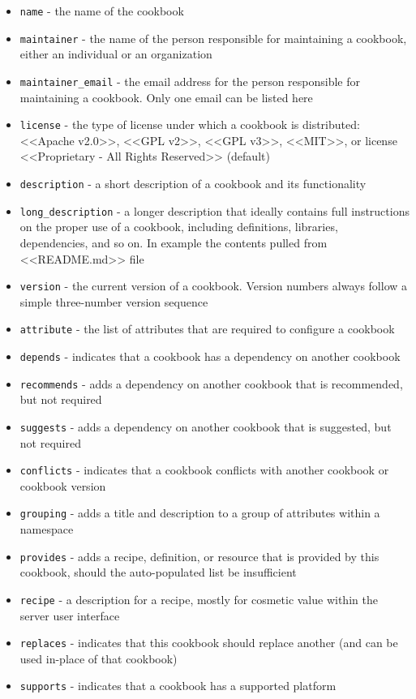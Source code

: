 \begin{itemize}
  \item \lstinline!name! - the name of the cookbook
  \item \lstinline!maintainer! - the name of the person responsible for maintaining a cookbook, either an individual or an organization
  \item \lstinline!maintainer_email! - the email address for the person responsible for maintaining a cookbook. Only one email can be listed here
  \item \lstinline!license! - the type of license under which a cookbook is distributed: <<Apache v2.0>>, <<GPL v2>>, <<GPL v3>>, <<MIT>>, or license <<Proprietary - All Rights Reserved>> (default)
  \item \lstinline!description! - a short description of a cookbook and its functionality
  \item \lstinline!long_description! - a longer description that ideally contains full instructions on the proper use of a cookbook, including definitions, libraries, dependencies, and so on. In example the contents pulled from <<README.md>> file
  \item \lstinline!version! - the current version of a cookbook. Version numbers always follow a simple three-number version sequence
  \item \lstinline!attribute! - the list of attributes that are required to configure a cookbook
  \item \lstinline!depends! - indicates that a cookbook has a dependency on another cookbook
  \item \lstinline!recommends! - adds a dependency on another cookbook that is recommended, but not required
  \item \lstinline!suggests! - adds a dependency on another cookbook that is suggested, but not required
  \item \lstinline!conflicts! - indicates that a cookbook conflicts with another cookbook or cookbook version
  \item \lstinline!grouping! - adds a title and description to a group of attributes within a namespace
  \item \lstinline!provides! - adds a recipe, definition, or resource that is provided by this cookbook, should the auto-populated list be insufficient
  \item \lstinline!recipe! - a description for a recipe, mostly for cosmetic value within the server user interface
  \item \lstinline!replaces! - indicates that this cookbook should replace another (and can be used in-place of that cookbook)
  \item \lstinline!supports! - indicates that a cookbook has a supported platform
\end{itemize}

